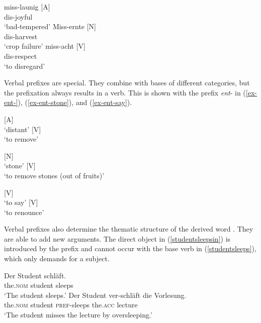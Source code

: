 \documentclass[output=paper
  ,nobabel
  ,draftmode
  ,colorlinks, citecolor=brown
]{langscibook}
\begin{document}
\eal\label{ex-miss}
\ex
\gll miss-launig  [A] \\ dis-joyful \\
\glt `bad-tempered'
\ex
\gll Miss-ernte [N] \\ dis-harvest \\
\glt `crop failure'
\ex
\gll miss-acht [V] \\ dis-respect \\
\glt `to disregard'
\zl

\noindent 
Verbal prefixes are special. They combine with bases of different categories, but the prefixation always results in a verb. This is shown with the prefix \emph{ent}- in (\ref{ex-ent-}), (\ref{ex-ent-stone}), and (\ref{ex-ent-say}).

\eal\label{ex-ent-}
\ex {} [A]\\ `distant'
\ex {} [V]\\ `to remove'
\zl

\eal\label{ex-ent-stone}
\ex {} [N]\\ `stone'
\ex {} [V]\\ `to remove stones (out of fruits)'
\zl

\eal\label{ex-ent-say}
\ex {} [V]\\ `to say'
\ex {} [V]\\ `to renounce'
\zl

\noindent Verbal prefixes also determine the thematic structure of the derived word \citep[cf.\ e.g.][]{Wunderlich1987}. They are able to add new arguments. The direct object in (\ref{studentsleepsin}) is introduced by the prefix and cannot occur with the base verb in (\ref{studentsleeps}), which only demands for a subject.

\eal
\ex\label{studentsleeps}
\gll Der               Student   schläft.    \\ 
     the.\textsc{nom}  student   sleeps   \\
\glt `The student sleeps.'
\ex\label{studentsleepsin}
\gll Der             Student   ver-schläft   die           Vorlesung. \\ 
     the.\textsc{nom}   student   \textsc{pref}-sleeps   the.\textsc{acc}   lecture \\
\glt `The student misses the lecture by oversleeping.'
\zl
\end{document}
